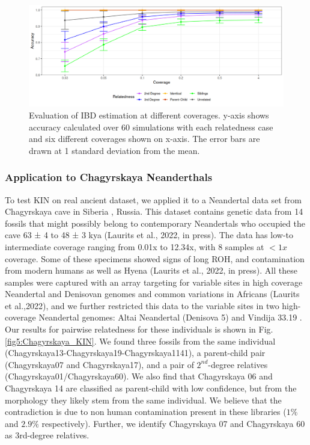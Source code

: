\documentclass[12pt, letterpaper]{article}
\begin{document}
\begin{figure}[h!]
    \includegraphics[width=16cm]{plots/plotimg/plot_IBDaccuracy.png}
    \centering
    \caption{Evaluation of IBD estimation at different coverages. y-axis shows accuracy calculated over 60 simulations with each relatedness case and six different coverages shown on x-axis. The error bars are drawn at 1 standard deviation from the mean.}
    \label{fig4:IBDstate_accuracy}
\end{figure}


\subsubsection{Application to Chagyrskaya Neanderthals}
To test KIN on real ancient dataset, we applied it to a Neandertal data set  from Chagyrskaya cave in Siberia \cite{kolobova_archaeological_2020-1}, Russia. This dataset contains genetic data from  14 fossils that might  possibly belong to contemporary Neandertals who occupied the cave 63 ± 4 to 48 ± 3 kya (Laurits et al., 2022, in press). The data has low-to intermediate coverage ranging from 0.01x to 12.34x, with 8 samples at  $<1x$ coverage. Some of these specimens showed signs of long ROH, and contamination from modern humans as well as Hyena (Laurits et al., 2022, in press). All these samples were captured with an array targeting for variable sites in high coverage Neandertal and Denisovan genomes and common variations in Africans (Laurits et al.,2022), and we further restricted  this data to the variable sites in two high-coverage Neandertal genomes: Altai Neandertal (Denisova 5) \cite{prufer_complete_2014} and Vindija 33.19 \cite{prufer_high-coverage_2017}. Our results for pairwise relatedness for these individuals is shown in Fig.\ref{fig5:Chagyrskaya_KIN}. We found three fossils from the same  individual (Chagyrskaya13-Chagyrskaya19-Chagyrskaya1141), a parent-child pair  (Chagyrskaya07 and Chagyrskaya17), and a pair of  $2^{nd}$-degree relatives (Chagyrskaya01/Chagyrskaya60). We also find that Chagyrskaya 06 and Chagyrskaya 14 are classified as parent-child with low confidence, but from the morphology they likely stem from the same individual. We believe that the contradiction is due to non human contamination present in these libraries ($1\%$ and $2.9\%$ respectively). Further, we identify   Chagyrskaya 07 and Chagyrskaya 60 as 3rd-degree relatives. 
\end{document}
